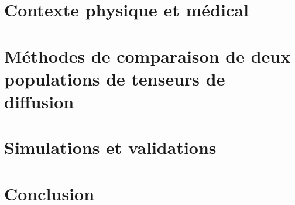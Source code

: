 \documentclass[a4paper,12pt,twoside,openright]{book}
\begin{document}
    \frontmatter
    
    \pagestyle{empty}
    
    
    
    \pagestyle{front}
    \tableofcontents
    
    \mainmatter
    
    \pagestyle{introduction}
    \label{Intro}
    
    
    \pagestyle{main}
    \part{Contexte physique et médical}
    \label{Part1}
    
    
    
    \part{Méthodes de comparaison de deux populations de tenseurs de diffusion}
    \label{Part2}
    
    
    
    
    
    
    \part{Simulations et validations}
    \label{Part3}
    
    
    
    
    
    
    \part{Conclusion}
    \label{Conclu}
    
    
    \pagestyle{introduction}
    \label{Biblio}
    
    
    
    \backmatter
    \listoffigures
    \listoftables
%     
\end{document}
